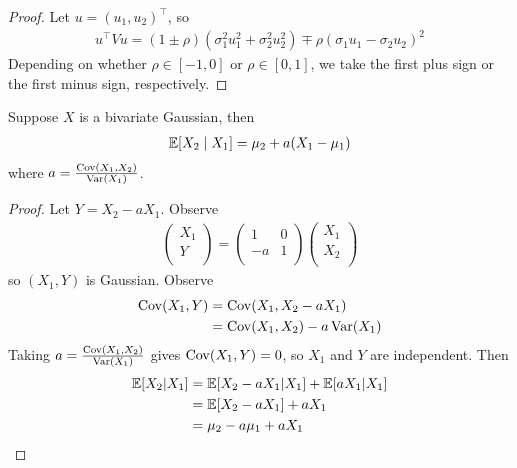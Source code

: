 \documentclass{../template/note}
\begin{document}
    \begin{proof}
        Let \(u = (u_1, u_2)^\intercal\), so
        \begin{align*}
            u^\intercal V u = (1 \pm \rho)(\sigma_1^2 u_1^2 + \sigma_2^2 u_2^2) \mp \rho(\sigma_1 u_1 - \sigma_2 u_2)^2
        \end{align*}
        Depending on whether \(\rho \in [-1, 0]\) or \(\rho \in [0, 1]\), we take the first plus sign or the first minus sign, respectively.       
    \end{proof}

    \begin{proposition}
        Suppose \(X\) is a bivariate Gaussian, then
        \begin{align*}
            \mathbb E[X_2 \mid X_1] = \mu_2 + a(X_1 - \mu_1)
        \end{align*}
        where \(a = \frac{\operatorname{Cov}(X_1, X_2)}{\operatorname{Var}(X_1)}\).        
    \end{proposition}

    \begin{proof}
        Let \(Y = X_2 - aX_1\). Observe
        \begin{align*}
            \begin{pmatrix}
                X_1 \\
                Y \\
            \end{pmatrix} = \begin{pmatrix}
                1 & 0 \\
                -a & 1 \\
            \end{pmatrix}\begin{pmatrix}
                X_1 \\
                X_2 \\
            \end{pmatrix} 
        \end{align*}
        so \((X_1, Y)\) is Gaussian. Observe
        \begin{align*}
            \operatorname{Cov}(X_1, Y) &= \operatorname{Cov}(X_1, X_2 - aX_1) \\
            &= \operatorname{Cov}(X_1, X_2) - a\operatorname{Var}(X_1)
        \end{align*}
        Taking \(a = \frac{\operatorname{Cov}(X_1, X_2)}{\operatorname{Var}(X_1)}\) gives \(\operatorname{Cov}(X_1, Y) = 0\), so \(X_1\) and \(Y\) are independent. Then
        \begin{align*}
            \mathbb E[X_2 | X_1] &= \mathbb E[X_2 - aX_1 | X_1] + \mathbb E[aX_1 | X_1]\\
            &= \mathbb E[X_2 - aX_1] + aX_1 \\
            &= \mu_2 - a\mu_1 + aX_1
        \end{align*}
    \end{proof}
    
\end{document}
